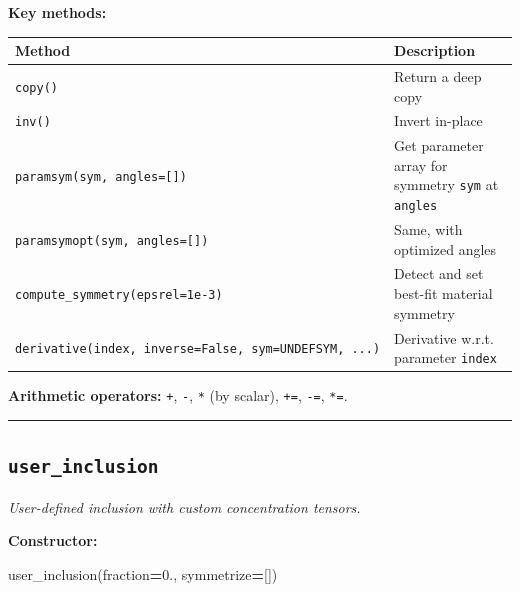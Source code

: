 \documentclass[
  a4paper,
  numbers=noendperiod,
  DIV=12]{scrreprt}
\newenvironment{Shaded}{\begin{snugshade}}{\end{snugshade}}
\newcommand{\FloatTok}[1]{\textcolor[rgb]{0.00,0.00,0.81}{#1}}
\newcommand{\NormalTok}[1]{#1}
\newcommand{\OperatorTok}[1]{\textcolor[rgb]{0.81,0.36,0.00}{\textbf{#1}}}
\newcounter{none} %
\begin{document}
\textbf{Key methods:}

{\def\LTcaptype{none} %
\begin{longtable}[]{@{}
  >{\raggedright\arraybackslash}p{}
  >{\raggedright\arraybackslash}p{}@{}}
\toprule\noalign{}
\begin{minipage}[b]{\linewidth}\raggedright
Method
\end{minipage} & \begin{minipage}[b]{\linewidth}\raggedright
Description
\end{minipage} \\
\midrule\noalign{}
\endhead
\bottomrule\noalign{}
\endlastfoot
\texttt{copy()} & Return a deep copy \\
\texttt{inv()} & Invert in-place \\
\texttt{paramsym(sym,\ angles={[}{]})} & Get parameter array for
symmetry \texttt{sym} at \texttt{angles} \\
\texttt{paramsymopt(sym,\ angles={[}{]})} & Same, with optimized
angles \\
\texttt{compute\_symmetry(epsrel=1e-3)} & Detect and set best-fit
material symmetry \\
\texttt{derivative(index,\ inverse=False,\ sym=UNDEFSYM,\ ...)} &
Derivative w.r.t. parameter \texttt{index} \\
\end{longtable}
}

\textbf{Arithmetic operators:} \texttt{+}, \texttt{-}, \texttt{*} (by
scalar), \texttt{+=}, \texttt{-=}, \texttt{*=}.

\begin{center}\rule{0.5\linewidth}{0.5pt}\end{center}

\subsection{\texorpdfstring{\texttt{user\_inclusion}}{user\_inclusion}}\label{api-user-inclusion}

\emph{User-defined inclusion with custom concentration tensors.}

\textbf{Constructor:}

\begin{Shaded}
\begin{Highlighting}[]
\NormalTok{user\_inclusion(fraction}\OperatorTok{=}\FloatTok{0.}\NormalTok{, symmetrize}\OperatorTok{=}\NormalTok{[])}
\end{Highlighting}
\end{Shaded}
\end{document}
